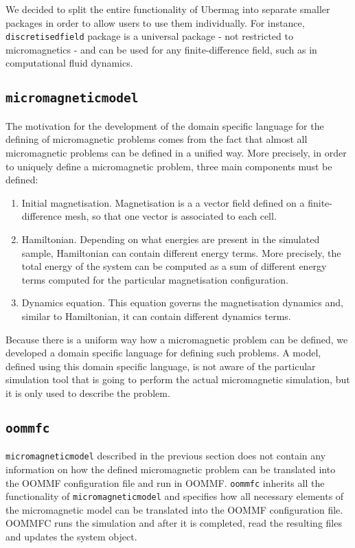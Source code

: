 \documentclass{deliverablereport}
\begin{document}
We decided to split the entire functionality of Ubermag into separate smaller packages in order to allow users to use them individually. For instance, \texttt{discretisedfield} package is a universal package - not restricted to micromagnetics - and can be used for any finite-difference field, such as in computational fluid dynamics. 

\subsection{\texttt{micromagneticmodel}}\label{sec:micromagneticmodel}

The motivation for the development of the domain specific language for the defining of micromagnetic problems comes from the fact that almost all micromagnetic problems can be defined in a unified way. More precisely, in order to uniquely define a micromagnetic problem, three main components must be defined:

\begin{enumerate}
\item Initial magnetisation. Magnetisation is a a vector field defined on a finite-difference mesh, so that one vector is associated to each cell.
\item Hamiltonian. Depending on what energies are present in the simulated sample, Hamiltonian can contain different energy terms. More precisely, the total energy of the system can be computed as a sum of different energy terms computed for the particular magnetisation configuration.
  \item Dynamics equation. This equation governs the magnetisation dynamics and, similar to Hamiltonian, it can contain different dynamics terms.
\end{enumerate}

Because there is a uniform way how a micromagnetic problem can be defined, we developed a domain specific language for defining such problems. A model, defined using this domain specific language, is not aware of the particular simulation tool that is going to perform the actual micromagnetic simulation, but it is only used to describe the problem.

\subsection{\texttt{oommfc}}\label{sec:oommfc}

\texttt{micromagneticmodel} described in the previous section does not contain any information on how the defined micromagnetic problem can be translated into the OOMMF configuration file and run in OOMMF. \texttt{oommfc} inherits all the functionality of \texttt{micromagneticmodel} and specifies how all necessary elements of the micromagnetic model can be translated into the OOMMF configuration file. OOMMFC runs the simulation and after it is completed, read the resulting files and updates the system object.
\end{document}
